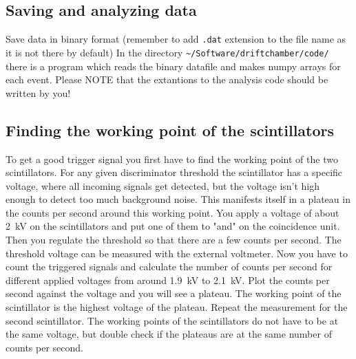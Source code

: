\documentclass[12pt]{article}
\begin{document}
\subsection{Saving and analyzing data}
Save data in binary format (remember to add \verb|.dat| extension to the file name as it is not there by default) In the directory \verb|~/Software/driftchamber/code/| there is a program which reads the binary datafile and makes numpy arrays for each event. Please NOTE that the extantions to the analysis code  should be written by you!

\subsection{Finding the working point of the scintillators}
To get a good trigger signal you first have to find the working point of the two scintillators. For any given discriminator threshold the scintillator has a specific voltage, where all incoming signals get detected, but the voltage isn't high enough to detect too much background noise. This manifests itself in a plateau in the counts per second around this working point. You apply a voltage of about \SI{2}{\kilo\volt} on the scintillators and put one of them to "and" on the coincidence unit. Then you regulate the threshold so that there are a few counts per second. The threshold voltage can be measured with the external voltmeter. Now you have to count the triggered signals and calculate the number of counts per second for different applied voltages from around \SI{1.9}{\kilo\volt} to \SI{2.1}{\kilo\volt}. Plot the counts per second against the voltage and you will see a plateau. The working point of the scintillator is the highest voltage of the plateau. Repeat the measurement for the second scintillator. The working points of the scintillators do not have to be at the same voltage, but double check if the plateaus are at the same number of counts per second.

\end{document}

